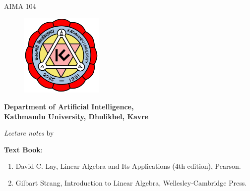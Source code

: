 \vspace*{2cm}
{\begin{center}
  {\Huge
    {\bfseries {\thetitle}}} \\
        \vspace{5mm}
        {\large AIMA 104}
  \vspace{3cm}

\begin{figure}[h]
	\centering
	\includegraphics[height=4cm,width=4cm]{images/Kulogo.png}
\end{figure}

\vspace{1cm}

	{\large \bfseries Department of Artificial Intelligence, \\[1mm]
 Kathmandu University, Dhulikhel, Kavre}

\vspace{2cm}
        \textit{Lecture notes}
	by\\
	{\bfseries  \theauthor}

\vspace{1cm}

\textbf{Text Book}:
\begin{enumerate}
\item David C. Lay, Linear Algebra and Its Applications (4th edition), Pearson.
\item Gilbart Strang, Introduction to Linear Algebra, Wellesley-Cambridge Press.
\end{enumerate}
    \vspace{1.5cm}

{\thedate}

\thispagestyle{empty}
\end{center}}


\clearpage
